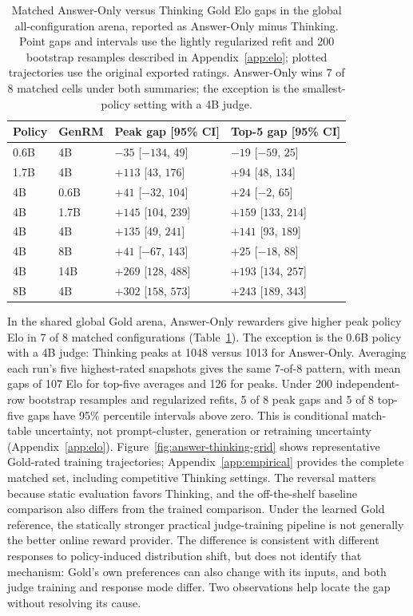 \documentclass[11pt,letterpaper]{article}
\begin{document}
\begin{table}[t]
\centering
\small
\begin{tabular}{llll}
\toprule
Policy & GenRM & Peak gap [95\% CI] & Top-5 gap [95\% CI] \\
\midrule
0.6B & 4B & $-35$ [$-134$, $49$] & $-19$ [$-59$, $25$] \\
1.7B & 4B & $+113$ [$43$, $176$] & $+94$ [$48$, $134$] \\
4B & 0.6B & $+41$ [$-32$, $104$] & $+24$ [$-2$, $65$] \\
4B & 1.7B & $+145$ [$104$, $239$] & $+159$ [$133$, $214$] \\
4B & 4B & $+135$ [$49$, $241$] & $+141$ [$93$, $189$] \\
4B & 8B & $+41$ [$-67$, $143$] & $+25$ [$-18$, $88$] \\
4B & 14B & $+269$ [$128$, $488$] & $+193$ [$134$, $257$] \\
8B & 4B & $+302$ [$158$, $573$] & $+243$ [$189$, $343$] \\
\bottomrule
\end{tabular}
\caption{Matched Answer-Only versus Thinking Gold Elo gaps in the global all-configuration arena, reported as Answer-Only minus Thinking. Point gaps and intervals use the lightly regularized refit and 200 bootstrap resamples described in Appendix~\ref{app:elo}; plotted trajectories use the original exported ratings. Answer-Only wins 7 of 8 matched cells under both summaries; the exception is the smallest-policy setting with a 4B judge.}
\label{tab:answer-thinking-summary}
\end{table}

In the shared global Gold arena, Answer-Only rewarders give higher peak policy Elo in 7 of 8 matched configurations (Table~\ref{tab:answer-thinking-summary}). The exception is the 0.6B policy with a 4B judge: Thinking peaks at 1048 versus 1013 for Answer-Only. Averaging each run's five highest-rated snapshots gives the same 7-of-8 pattern, with mean gaps of 107 Elo for top-five averages and 126 for peaks. Under 200 independent-row bootstrap resamples and regularized refits, 5 of 8 peak gaps and 5 of 8 top-five gaps have 95\% percentile intervals above zero. This is conditional match-table uncertainty, not prompt-cluster, generation or retraining uncertainty (Appendix~\ref{app:elo}). Figure~\ref{fig:answer-thinking-grid} shows representative Gold-rated training trajectories; Appendix~\ref{app:empirical} provides the complete matched set, including competitive Thinking settings.
The reversal matters because static evaluation favors Thinking, and the off-the-shelf baseline comparison also differs from the trained comparison. Under the learned Gold reference, the statically stronger practical judge-training pipeline is not generally the better online reward provider.
The difference is consistent with different responses to policy-induced distribution shift, but does not identify that mechanism: Gold's own preferences can also change with its inputs, and both judge training and response mode differ. Two observations help locate the gap without resolving its cause.
\end{document}
